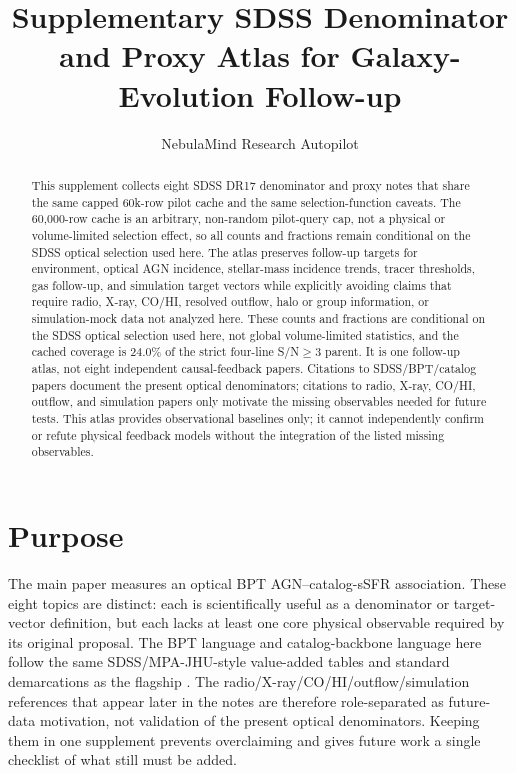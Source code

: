 \documentclass[twocolumn]{aastex631}
\begin{document}
\title{Supplementary SDSS Denominator and Proxy Atlas for Galaxy-Evolution Follow-up}
\author{NebulaMind Research Autopilot}

\begin{abstract}
This supplement collects eight SDSS DR17 denominator and proxy notes that share the same capped 60k-row pilot cache and the same selection-function caveats. The 60,000-row cache is an arbitrary, non-random pilot-query cap, not a physical or volume-limited selection effect, so all counts and fractions remain conditional on the SDSS optical selection used here. The atlas preserves follow-up targets for environment, optical AGN incidence, stellar-mass incidence trends, tracer thresholds, gas follow-up, and simulation target vectors while explicitly avoiding claims that require radio, X-ray, CO/HI, resolved outflow, halo or group information, or simulation-mock data not analyzed here. These counts and fractions are conditional on the SDSS optical selection used here, not global volume-limited statistics, and the cached coverage is 24.0\% of the strict four-line S/N$\geq3$ parent. It is one follow-up atlas, not eight independent causal-feedback papers. Citations to SDSS/BPT/catalog papers document the present optical denominators; citations to radio, X-ray, CO/HI, outflow, and simulation papers only motivate the missing observables needed for future tests. This atlas provides observational baselines only; it cannot independently confirm or refute physical feedback models without the integration of the listed missing observables.
\end{abstract}


\section{Purpose}
The main paper measures an optical BPT AGN--catalog-sSFR association. These eight topics are distinct: each is scientifically useful as a denominator or target-vector definition, but each lacks at least one core physical observable required by its original proposal. The BPT language and catalog-backbone language here follow the same SDSS/MPA-JHU-style value-added tables and standard demarcations as the flagship \citep{sdssdr17,brinchmann2004,york2000,baldwin1981,kewley2001,kauffmann2003bpt,kewley2006,stasinska2008,stasinska2015}. The radio/X-ray/CO/HI/outflow/simulation references that appear later in the notes are therefore role-separated as future-data motivation, not validation of the present optical denominators. Keeping them in one supplement prevents overclaiming and gives future work a single checklist of what still must be added.
\end{document}
